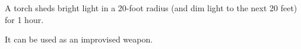 

A torch sheds bright light in a 20-foot radius (and dim light to the next 20 feet) for 1 hour. 

It can be used as an improvised weapon.

{}

\vfill

\hfill{}
